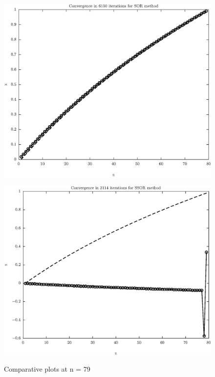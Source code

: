 \documentclass[11pt]{article}
\begin{document}
\begin{figure}
\begin{minipage}{.45\textwidth}
\label{fig:test2}
\end{minipage}\hfill
\\
\begin{minipage}{.45\textwidth}
\centering
\includegraphics[width=\linewidth]{math609_pa2_comp_example_1_n_79_k_SOR_part_a.eps}
\label{fig:test3}
\end{minipage}\hfill
\begin{minipage}{.45\textwidth}
\centering
\includegraphics[width=\linewidth]{math609_pa2_comp_example_1_n_79_k_SSOR_part_a.eps}
\label{fig:test3}
\end{minipage}\hfill
\caption{Comparative plots at n = 79}
\end{figure}
\end{document}
